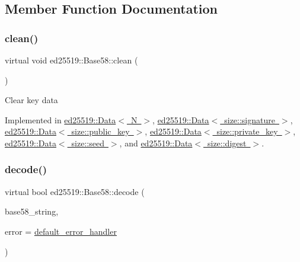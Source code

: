 \subsection{Member Function Documentation}
\mbox{\label{classed25519_1_1_base58_aed901927e6a283e0c4d3fb13745233dc}} 
\subsubsection{\texorpdfstring{clean()}{clean()}}
{\footnotesize\ttfamily virtual void ed25519\+::\+Base58\+::clean (\begin{DoxyParamCaption}{ }\end{DoxyParamCaption})\hspace{0.3cm}{\ttfamily [pure virtual]}}

Clear key data 

Implemented in \mbox{\hyperlink{classed25519_1_1_data_a22626c9e5a951dd673bfda8e78bf14fc}{ed25519\+::\+Data$<$ N $>$}}, \mbox{\hyperlink{classed25519_1_1_data_a22626c9e5a951dd673bfda8e78bf14fc}{ed25519\+::\+Data$<$ size\+::signature $>$}}, \mbox{\hyperlink{classed25519_1_1_data_a22626c9e5a951dd673bfda8e78bf14fc}{ed25519\+::\+Data$<$ size\+::public\+\_\+key $>$}}, \mbox{\hyperlink{classed25519_1_1_data_a22626c9e5a951dd673bfda8e78bf14fc}{ed25519\+::\+Data$<$ size\+::private\+\_\+key $>$}}, \mbox{\hyperlink{classed25519_1_1_data_a22626c9e5a951dd673bfda8e78bf14fc}{ed25519\+::\+Data$<$ size\+::seed $>$}}, and \mbox{\hyperlink{classed25519_1_1_data_a22626c9e5a951dd673bfda8e78bf14fc}{ed25519\+::\+Data$<$ size\+::digest $>$}}.

\mbox{\label{classed25519_1_1_base58_a3cb74be32923dcfb03a24b65015bee84}} 
\subsubsection{\texorpdfstring{decode()}{decode()}}
{\footnotesize\ttfamily virtual bool ed25519\+::\+Base58\+::decode (\begin{DoxyParamCaption}\item[{const std\+::string \&}]{base58\+\_\+string,  }\item[{const \mbox{\hyperlink{namespaceed25519_a6ba572942b3c18591fc869d52a6b16e6}{Error\+Handler}} \&}]{error = {\ttfamily \mbox{\hyperlink{namespaceed25519_a7c7bb6ed17541162959c33ed3e3b15fb}{default\+\_\+error\+\_\+handler}}} }\end{DoxyParamCaption})\hspace{0.3cm}{\ttfamily [pure virtual]}}

